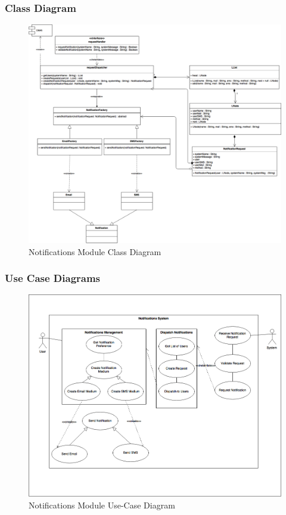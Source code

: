 \documentclass{article}
\begin{document}
        \subsubsection{Class Diagram}
		\begin{figure}[H]
    			\includegraphics[width=\textwidth]{Notifications_Class_Diagram}
			\caption{Notifications Module Class Diagram}
		\end{figure}
        \subsubsection{Use Case Diagrams}
			\begin{figure}[H]
    			\includegraphics[width=\textwidth]{NotificationUseCases}
			\caption{Notifications Module Use-Case Diagram}
			\end{figure}
\end{document}
